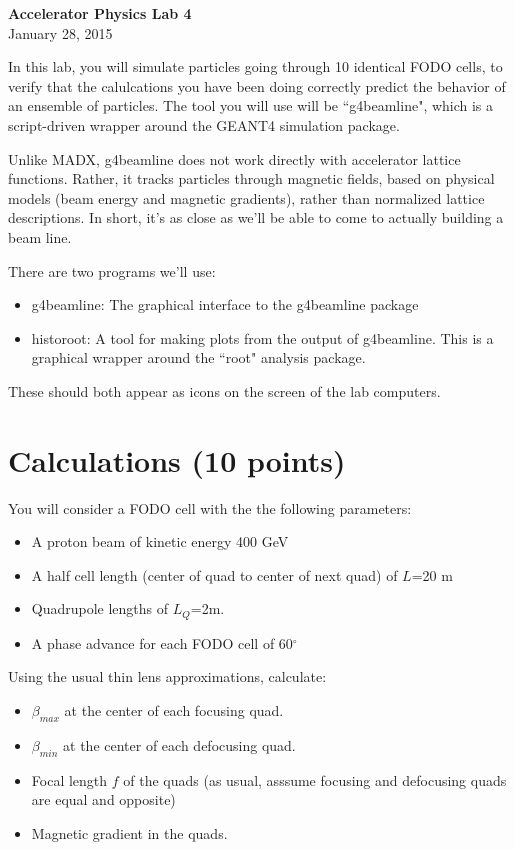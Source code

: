 \documentclass{article}
\begin{document}
\begin{centering}
{\bf Accelerator Physics Lab 4}\\
January 28, 2015\\
\end{centering}

In this lab, you will simulate particles going through 10 identical FODO cells, to verify that the calulcations you have
been doing correctly predict the behavior of an ensemble of particles.  The tool you will use will
be ``g4beamline"\cite{ref:g4beamline}, which is a script-driven wrapper around the GEANT4 simulation
package.

Unlike MADX, g4beamline does not work directly with accelerator lattice functions.  Rather, it
tracks particles through magnetic fields, based on physical models (beam energy and magnetic gradients),
rather than normalized lattice descriptions.  In short, it's as close as we'll be able to come to actually
building a beam line.

There are two programs we'll use:
\begin{itemize}
\item g4beamline:  The graphical interface to the g4beamline package
\item historoot: A tool for making plots from the output of g4beamline.  This is a graphical wrapper around the ``root" analysis package.
\end{itemize}

These should both appear as icons on the screen of the lab computers.

\section{Calculations (10 points)}

You will consider a FODO cell with the the following parameters:
\begin{itemize}
\item A proton beam of kinetic energy 400 GeV
\item A  half cell length (center of quad to center of next quad) of $L$=20 m
\item Quadrupole lengths of $L_Q$=2m.
\item A phase advance for each FODO cell of 60$^\circ$
\end{itemize}

Using the usual thin lens approximations, calculate:
\begin{itemize}
\item $\beta_{max}$ at the center of each focusing quad.
\item $\beta_{min}$ at the center of each defocusing quad.
\item Focal length $f$ of the quads (as usual, asssume focusing and defocusing quads are equal and opposite)
\item Magnetic gradient in the quads.
\end{itemize}
\end{document}
